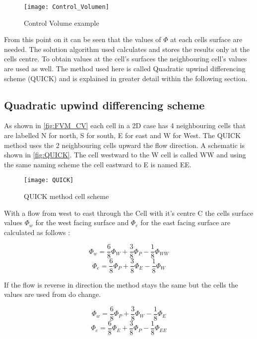 \documentclass[../thesis.tex]{subfiles}
\begin{document}
\begin{figure}[htbp]
	\centering
	\texttt{[image: Control\_Volumen]}
	\caption{Control Volume example}
	\label{fig:FVM_CV}
\end{figure}

From this point on it can be seen that the values of $\Phi$ at each cells surface are needed. The solution algorithm used calculates and stores the results only at the cells centre. To obtain values at the cell's surfaces the neighbouring cell's values are used as well. The method used here is called Quadratic upwind differencing scheme (QUICK) and is explained in greater detail within the following section.

\subsection{Quadratic upwind differencing scheme}
\label{sec:QUICK}

As shown in \autoref{fig:FVM_CV} each cell in a 2D case has 4 neighbouring cells that are labelled N for north, S for south, E for east and W for West. The QUICK method uses the 2 neighbouring cells upward the flow direction. A schematic is shown in \autoref{fig:QUICK}. The cell westward to the W cell is called WW and using the same naming scheme the cell eastward to E is named EE.

\begin{figure}[htbp]
	\centering
	\texttt{[image: QUICK]}
	\caption{QUICK method cell scheme}
	\label{fig:QUICK}
\end{figure}

With a flow from west to east through the Cell with it's centre C the cells surface values $\Phi_w$ for the west facing surface and $\Phi_e$ for the east facing surface are calculated as follows \cite{versteeg2007introduction}:

\begin{equation}
	\Phi_w = \dfrac{6}{8} \Phi_W + \dfrac{3}{8} \Phi_P - \dfrac{1}{8} \Phi_{WW}
\end{equation}
\begin{equation}
	\Phi_e = \dfrac{6}{8} \Phi_P + \dfrac{3}{8} \Phi_E - \dfrac{1}{8} \Phi_{W}
\end{equation}

If the flow is reverse in direction the method stays the same but the cells the values are used from do change.

\begin{equation}
	\Phi_w = \dfrac{6}{8} \Phi_P + \dfrac{3}{8} \Phi_W - \dfrac{1}{8} \Phi_{E}
\end{equation}
\begin{equation}
	\Phi_e = \dfrac{6}{8} \Phi_E + \dfrac{3}{8} \Phi_P - \dfrac{1}{8} \Phi_{EE}
\end{equation}
\end{document}
